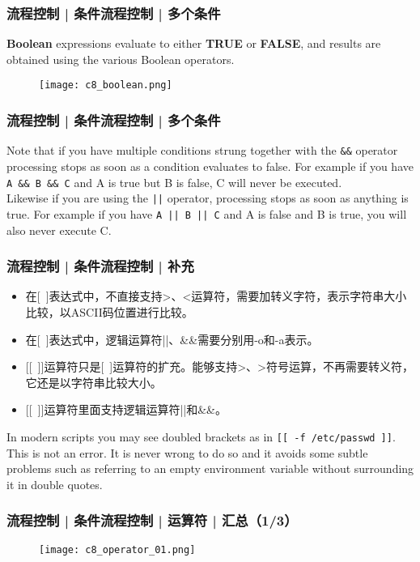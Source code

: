 \begin{frame}[fragile]
  \frametitle{流程控制 | 条件流程控制 | 多个条件}
  \textbf{Boolean} expressions evaluate to either \textbf{TRUE} or \textbf{FALSE}, and results are obtained using the various Boolean operators.
  \begin{figure}
    \centering
    \texttt{[image: c8\_boolean.png]}
  \end{figure}
\end{frame}

\begin{frame}[fragile]
  \frametitle{流程控制 | 条件流程控制 | 多个条件}
  Note that if you have multiple conditions strung together with the \verb|&&| operator processing stops as soon as a condition evaluates to false.  For example if you have \verb|A && B && C| and A is true but B is false, C will never be executed.\\
  \vspace{0.3cm}
  Likewise if you are using the \verb=||= operator, processing stops as soon as anything is true. For example if you have \verb=A || B || C= and A is false and B is true, you will also never execute C.
\end{frame}

\begin{frame}[fragile]
  \frametitle{流程控制 | 条件流程控制 | 补充}
  \begin{itemize}
    \item 在[\ ]表达式中，不直接支持>、<运算符，需要加转义字符，表示字符串大小比较，以ASCII码位置进行比较。
    \item 在[\ ]表达式中，逻辑运算符||、\&\&需要分别用-o和-a表示。
    \item {[[}\ {]]}运算符只是[\ ]运算符的扩充。能够支持>、>符号运算，不再需要转义符，它还是以字符串比较大小。
    \item {[[}\ {]]}运算符里面支持逻辑运算符||和\&\&。
  \end{itemize}
  In modern scripts you may see doubled brackets as in \verb|[[ -f /etc/passwd ]]|. This is not an error. It is never wrong to do so and it avoids some subtle problems such as referring to an empty environment variable without surrounding it in double quotes.
\end{frame}

\begin{frame}
  \frametitle{流程控制 | 条件流程控制 | 运算符 | 汇总（1/3）}
  \begin{figure}
    \centering
    \texttt{[image: c8\_operator\_01.png]}
  \end{figure}
\end{frame}

